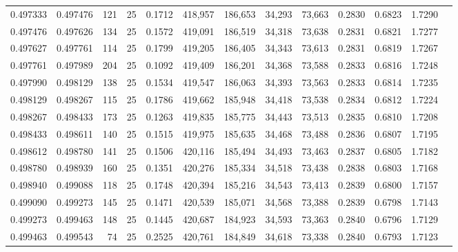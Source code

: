 \begin{tabular}{rrrrrrrrrrrrr}
0.497333 & 0.497476 &   121 &  25 &                                     0.1712 & 418,957 & 186,653 &  34,293 &  73,663 & 0.2830 & 0.6823 & 1.7290 \\
0.497476 & 0.497626 &   134 &  25 &                                     0.1572 & 419,091 & 186,519 &  34,318 &  73,638 & 0.2831 & 0.6821 & 1.7277 \\
0.497627 & 0.497761 &   114 &  25 &                                     0.1799 & 419,205 & 186,405 &  34,343 &  73,613 & 0.2831 & 0.6819 & 1.7267 \\
0.497761 & 0.497989 &   204 &  25 &                                     0.1092 & 419,409 & 186,201 &  34,368 &  73,588 & 0.2833 & 0.6816 & 1.7248 \\
0.497990 & 0.498129 &   138 &  25 &                                     0.1534 & 419,547 & 186,063 &  34,393 &  73,563 & 0.2833 & 0.6814 & 1.7235 \\
0.498129 & 0.498267 &   115 &  25 &                                     0.1786 & 419,662 & 185,948 &  34,418 &  73,538 & 0.2834 & 0.6812 & 1.7224 \\
0.498267 & 0.498433 &   173 &  25 &                                     0.1263 & 419,835 & 185,775 &  34,443 &  73,513 & 0.2835 & 0.6810 & 1.7208 \\
0.498433 & 0.498611 &   140 &  25 &                                     0.1515 & 419,975 & 185,635 &  34,468 &  73,488 & 0.2836 & 0.6807 & 1.7195 \\
0.498612 & 0.498780 &   141 &  25 &                                     0.1506 & 420,116 & 185,494 &  34,493 &  73,463 & 0.2837 & 0.6805 & 1.7182 \\
0.498780 & 0.498939 &   160 &  25 &                                     0.1351 & 420,276 & 185,334 &  34,518 &  73,438 & 0.2838 & 0.6803 & 1.7168 \\
0.498940 & 0.499088 &   118 &  25 &                                     0.1748 & 420,394 & 185,216 &  34,543 &  73,413 & 0.2839 & 0.6800 & 1.7157 \\
0.499090 & 0.499273 &   145 &  25 &                                     0.1471 & 420,539 & 185,071 &  34,568 &  73,388 & 0.2839 & 0.6798 & 1.7143 \\
0.499273 & 0.499463 &   148 &  25 &                                     0.1445 & 420,687 & 184,923 &  34,593 &  73,363 & 0.2840 & 0.6796 & 1.7129 \\
0.499463 & 0.499543 &    74 &  25 &                                     0.2525 & 420,761 & 184,849 &  34,618 &  73,338 & 0.2840 & 0.6793 & 1.7123 \\

\end{tabular}
